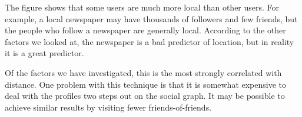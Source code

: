 The figure shows that some users are much more local than other users.
For example, a local newspaper may have thousands of followers and few friends,
but the people who follow a newspaper are generally local.
According to the other factors we looked at, the newspaper is a bad predictor
of location, but in reality it is a great predictor.

Of the factors we have investigated, this is the most strongly correlated with
distance.
One problem with this technique is that it is somewhat expensive to deal with
the profiles two steps out on the social graph.
It may be possible to achieve similar results by visiting fewer
friends-of-friends.

